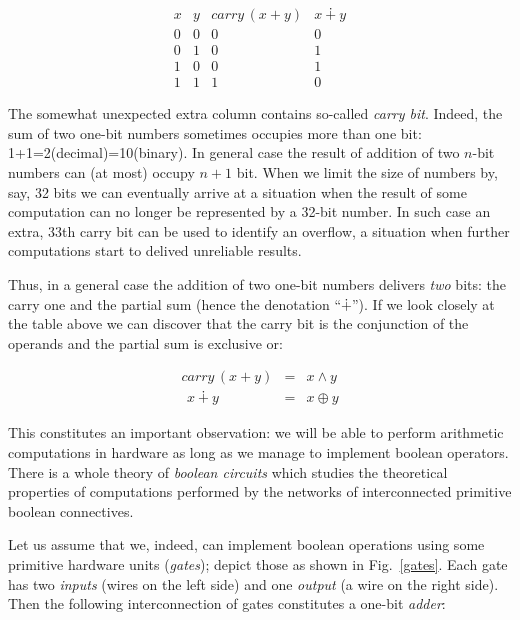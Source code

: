 \[
\begin{array}{cc||c|c}
  x & y & carry\,(x + y) & x\dotplus y \\
  \hline
  0 & 0 & 0 & 0   \\
  0 & 1 & 0 & 1   \\ 
  1 & 0 & 0 & 1   \\
  1 & 1 & 1 & 0 
\end{array}
\]

The somewhat unexpected extra column contains so-called \emph{carry bit}. Indeed, the sum of two one-bit numbers sometimes occupies
more than one bit: 1+1=2(decimal)=10(binary). In general case the result of addition of two $n$-bit numbers can (at most) occupy
$n+1$ bit. When we limit the size of numbers by, say, 32 bits we can eventually arrive at a situation when the result of some
computation can no longer be represented by a 32-bit number. In such case an extra, 33th carry bit can be used to
identify an overflow, a situation when further computations start to delived unreliable results.

Thus, in a general case the addition of two one-bit numbers delivers \emph{two} bits: the carry one and the partial sum (hence the
denotation ``$\dotplus$'').
If we look closely at the table above we can discover that the carry bit is the conjunction of the operands and the partial
sum is exclusive or:

\[
\begin{array}{rcl}
  carry\,(x + y) & = & x\wedge y\\
  \phantom{(}x\dotplus y\phantom{)} & = & x\oplus y
\end{array}
\]

This constitutes an important observation: we will be able to perform arithmetic computations in hardware as long as we manage to implement
boolean operators. There is a whole theory of \emph{boolean circuits} which studies the theoretical properties of computations
performed by the networks of interconnected primitive boolean connectives.

Let us assume that we, indeed, can implement boolean operations using some primitive hardware units (\emph{gates}); depict those as
shown in Fig.~\ref{gates}. Each gate has two \emph{inputs} (wires on the left side) and one \emph{output} (a wire on the right side). 
Then the following interconnection of gates constitutes a one-bit \emph{adder}:
 
